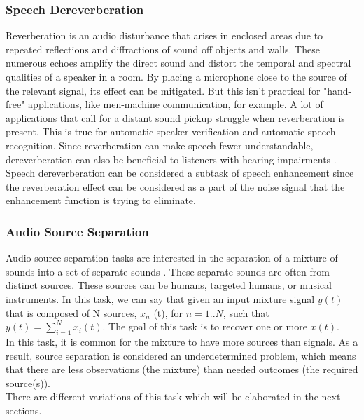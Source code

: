 \subsubsection{Speech Dereverberation}
Reverberation is an audio disturbance that arises in enclosed areas due to repeated reflections and diffractions of sound off objects and walls. These numerous echoes amplify the direct sound and distort the temporal and spectral qualities of a speaker in a room. By placing a microphone close to the source of the relevant signal, its effect can be mitigated. But this isn't practical for "hand-free" applications, like men-machine communication, for example. A lot of applications that call for a distant sound pickup struggle when reverberation is present. This is true for automatic speaker verification and automatic speech recognition. Since reverberation can make speech fewer understandable, dereverberation can also be beneficial to listeners with hearing impairments \cite{lebart2001}.
Speech dereverberation can be considered a subtask of speech enhancement since the reverberation effect can be considered as a part of the noise signal that the enhancement function is trying to eliminate.

\subsubsection{Audio Source Separation}
Audio source separation tasks are interested in the separation of a mixture of sounds into a set of separate sounds \cite{vincent2018}. These separate sounds are often from distinct sources. These sources can be humans, targeted humans, or musical instruments.
In this task, we can say that given an input mixture signal $y(t)$ that is composed of N sources, $x_n$ (t), for $n=1..N$, such that $y(t) = \sum_{i=1}^{N} x_i(t)$. The goal of this task is to recover one or more $x(t)$.\\
In this task, it is common for the mixture to have more sources than signals. As a result, source separation is considered an underdetermined problem, which means that there are less observations (the mixture) than needed outcomes (the required source(s)).\\
There are different variations of this task which will be elaborated in the next sections.


